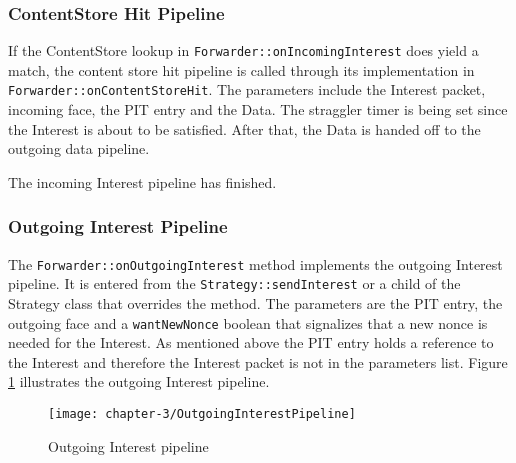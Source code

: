 \subsubsection{ContentStore Hit Pipeline}

If the ContentStore lookup in \texttt{Forwarder::onIncomingInterest} does yield a match, the content store hit pipeline is called through its implementation in \texttt{Forwarder::onContentStoreHit}. The parameters include the Interest packet, incoming face, the PIT entry and the Data. The straggler timer is being set since the Interest is about to be satisfied. After that, the Data is handed off to the outgoing data pipeline.

The incoming Interest pipeline has finished.

\subsubsection{Outgoing Interest Pipeline}

The \texttt{Forwarder::onOutgoingInterest} method implements the outgoing Interest pipeline. It is entered from the \texttt{Strategy::sendInterest} or a child of the Strategy class that overrides the method. The parameters are the PIT entry, the outgoing face and a \texttt{wantNewNonce} boolean that signalizes that a new nonce is needed for the Interest. As mentioned above the PIT entry holds a reference to the Interest and therefore the Interest packet is not in the parameters list. Figure \ref{fig:OutgoingInterestPipeline} illustrates the outgoing Interest pipeline.

\vspace{5mm} %

\begin{figure}[H]
  \centering
  \texttt{[image: chapter-3/OutgoingInterestPipeline]}
  \caption{Outgoing Interest pipeline \cite{Afanasyev16}}
  \label{fig:OutgoingInterestPipeline}
\end{figure}

\vspace{5mm} %

